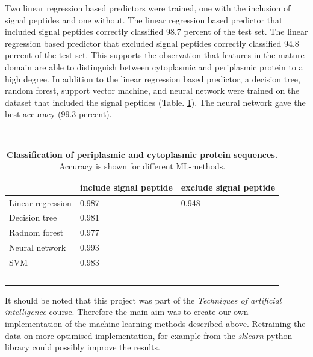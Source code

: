 Two linear regression based predictors were trained,
one with the inclusion of signal peptides and one without.
The linear regression based predictor that included signal peptides correctly classified 98.7 percent of the test set.
The linear regression based predictor that excluded signal peptides correctly classified 94.8 percent of the test set.
This supports the observation that features in the mature domain are able to distinguish between cytoplasmic and periplasmic protein to a high degree.
In addition to the linear regression based predictor,
a decision tree,
random forest,
support vector machine,
and neural network were trained on the dataset that included the signal peptides (Table. \ref{table:prediction}). 
The neural network gave the best accuracy (99.3 percent).


~\begin{longtable}[]{@{}lll@{}}
\toprule
& include signal peptide & exclude signal peptide\tabularnewline
\midrule
\endhead
Linear regression & 0.987 & 0.948\tabularnewline
Decision tree & 0.981 & \tabularnewline
Radnom forest & 0.977 & \tabularnewline
Neural network & 0.993 &\tabularnewline
SVM & 0.983 & \tabularnewline
\bottomrule
\caption{\textbf{Classification of periplasmic and cytoplasmic protein sequences.}
Accuracy is shown for different ML-methods.}
\label{table:prediction}
~\end{longtable}

It should be noted that this project was part of the \textit{Techniques of artificial intelligence} course.
Therefore the main aim was to create our own implementation of the machine learning methods described above.
Retraining the data on more optimised implementation, for example from the \textit{sklearn} python library could possibly improve the results.
